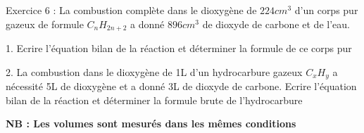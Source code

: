 \documentclass[12pt, french]{article}
\begin{document}

\begin{Box2}{Exercice 6 :}
La combustion complète dans le dioxygène de $224 cm^3$ d'un corps pur gazeux de formule $C_nH_{2n+2}$ a donné $896 cm^3$ de dioxyde de carbone et de l'eau.

   1. Ecrire l'équation bilan de la réaction et déterminer la formule de ce corps pur

   2. La combustion dans le dioxygène de 1L d'un hydrocarbure gazeux $C_xH_y$ a nécessité 5L de dioxygène et a donné 3L de dioxyde de carbone. Ecrire l'équation bilan de la réaction et déterminer la formule brute de l'hydrocarbure

   \textbf{NB : Les volumes sont mesurés dans les mêmes conditions}
\end{Box2}




\end{document}
